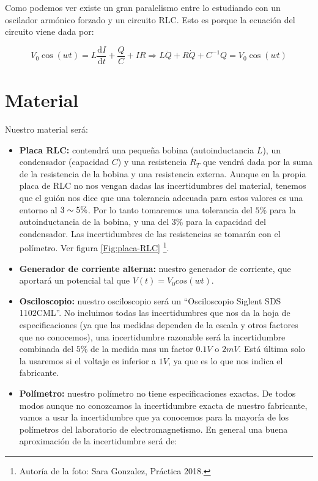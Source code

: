 \documentclass[12pt,a4paper]{article}
\newcommand{\D}{\mathrm{d}}
\begin{document}
Como podemos ver existe un gran paralelismo entre lo estudiando con un oscilador armónico forzado y un circuito RLC. Esto es porque la ecuación del circuito viene dada por:

\begin{equation}
V_0  \cos(w t) =  L \dfrac{\D I}{\D t} + \dfrac{Q}{C} + IR  \Longrightarrow  L \ddot{Q} + R \dot{Q} + C^{-1} Q = V_0 \cos (wt)
\end{equation}

\section{Material}


Nuestro material será:

\begin{itemize}
\item \textbf{Placa RLC:} contendrá una pequeña bobina (autoinductancia $L$), un condensador (capacidad $C$) y una resistencia $R_T$ que vendrá dada por la suma de la resistencia de la bobina y una resistencia externa. Aunque en la propia placa de RLC no nos vengan dadas las incertidumbres del material, tenemos que el guión nos dice que una tolerancia adecuada para estos valores es una entorno al $3 \thicksim 5\%$. Por lo tanto tomaremos una tolerancia del $ 5 \%$ para la autoinductancia de la bobina, y una del $3\%$ para la capacidad del condensador. Las incertidumbres de las resistencias se tomarán con el polímetro. Ver figura \ref{Fig:placa-RLC} \footnote{Autoría de la foto: Sara Gonzalez, Práctica 2018.}. 

\item \textbf{Generador de corriente alterna:} nuestro generador de corriente, que aportará un potencial tal que $V(t) = V_0cos(wt)$.


\item \textbf{Osciloscopio:} nuestro osciloscopio será un ``Osciloscopio Siglent SDS 1102CML''. No incluimos todas las incertidumbres que nos da la hoja de especificaciones (ya que las medidas dependen de la escala y otros factores que no conocemos), una incertidumbre razonable será la incertidumbre combinada del $5\%$ de la medida mas un factor $0.1 V$ o $2 mV$. Está última solo la usaremos si el voltaje es inferior a $1V$, ya que es lo que nos indica el fabricante. 


\item \textbf{Polímetro:} nuestro polímetro no tiene especificaciones exactas. De todos modos aunque no conozcamos la incertidumbre exacta de nuestro fabricante, vamos a usar la incertidumbre que ya conocemos para la mayoría de los polímetros del laboratorio de electromagnetismo. En general una buena aproximación de la incertidumbre será de:


\end{itemize}
\end{document}
